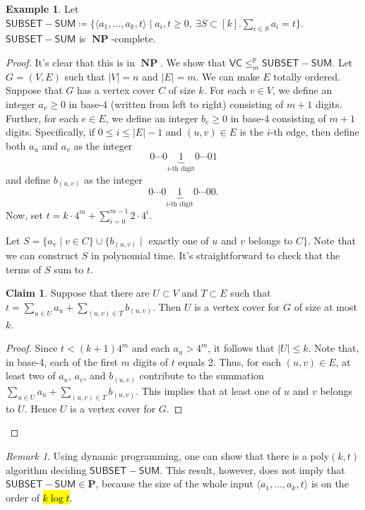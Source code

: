 \documentclass[10pt,letterpaper,cm]{nupset}
\theoremstyle{definition}
\newtheorem{exmp}[definition]{Example}
\theoremstyle{theorem}
\newtheorem*{claim}{Claim}
\theoremstyle{remark}
\newtheorem{remark}[definition]{Remark}
\newcommand{\1}{\mathbf{1}}
\newcommand{\0}{\vec 0}
\DeclareMathOperator{\NP}{\mathbf{NP}}
\begin{document}
\begin{exmp}
Let $\mathsf{SUBSET{-}SUM}\coloneqq \{\langle a_1, \ldots, a_k, t\rangle \mid a_i,t\geq 0,\ \exists S \subset [k].\sum_{i\in S} a_i = t\}$. $\mathsf{SUBSET{-}SUM}$ is $\NP$-complete.
\end{exmp}
\begin{proof}
It's clear that this is in $\NP$. We show that $\mathsf{VC} \leq_m^p \mathsf{SUBSET{-}SUM}$. Let $G=(V,E)$ such that $|V| = n$ and $|E|= m$. We can make $E$ totally ordered. Suppose that $G$ has a vertex cover $C$ of size $k$. For each $v\in V$, we define an integer $a_v\geq 0$ in base-4 (written from left to right) consisting of $m+1$ digits. Further, for each $e\in E$, we define an integer $b_e\geq 0$ in base-4 consisting of $m+1$ digits. Specifically, if $0\leq i \leq |E|-1$ and  $(u,v) \in E$ is the $i$-th edge, then define both $a_u$ and $a_v$  as the integer $$0 \cdots 0 \underbrace{1}_{i\text{-th digit}} 0 \cdots 01   $$ and define $b_{(u,v)}$ as the integer $$0 \cdots 0 \underbrace{1}_{i\text{-th digit}} 0 \cdots 00     .$$ Now, set $t= k \cdot 4^m + \sum_{i=0}^{m-1}2 \cdot 4^i$.

\medskip

 Let $S = \{a_v \mid v\in C\} \cup \{b_{(u,v)} \mid $ exactly one of $u$ and $v$ belongs to $C\}$. Note that we can construct $S$ in polynomial time. It's straightforward to check that the terms of $S$ sum to $t$. 
\begin{claim}
Suppose that there are $U\subset V$ and $T\subset E$ such that $t= \sum_{u\in U}a_u +\sum_{(u,v) \in T} b_{(u,v)}$. Then $U$ is a vertex cover for $G$ of size at most $k$.
\end{claim}
\begin{proof}
Since $t<(k+1)4^m$ and each $a_u> 4^m$, it follows that $|U|\leq k$. Note that, in base-4, each of the first $m$ digits of $t$ equals $2$. Thus, for each $(u,v) \in E$, at least two of $a_u$, $a_v$, and $b_{(u,v)}$ contribute to the summation $\sum_{u\in U}a_u +\sum_{(u,v) \in T} b_{(u,v)}$. This implies that at least one of $u$ and $v$ belongs to $U$. Hence $U$ is a vertex cover for $G$.
\end{proof}
\end{proof}

\begin{remark}
Using dynamic programming, one can show that there is a poly$(k, t)$ algorithm deciding $\mathsf{SUBSET{-}SUM}$. This result, however, does not imply that $\mathsf{SUBSET{-}SUM} \in \mathbf{P}$, because the size of the whole input $\langle a_1, \ldots, a_k, t\rangle$ is on the order of \hl{$k\log{t}$}.
\end{remark}
\end{document}
